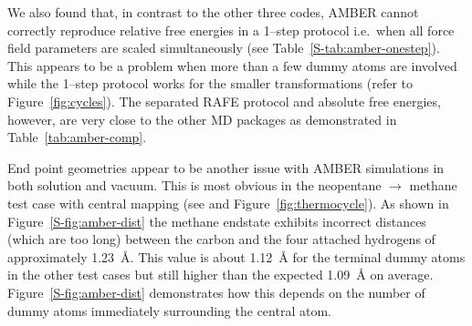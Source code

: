 \documentclass[journal=jctcce,manuscript=article]{achemso}
\begin{document}
We also found that, in contrast to the other three codes, AMBER cannot
correctly reproduce relative free energies in a 1--step protocol i.e.\
when all force field parameters are scaled simultaneously (see Table~\ref{S-tab:amber-onestep}).  This appears to be a problem when more than a few dummy atoms are involved while the 1--step protocol works for the smaller transformations (refer to Figure~\ref{fig:cycles}).  The separated RAFE protocol and absolute free energies, however, are very close to the other MD packages as demonstrated in Table~\ref{tab:amber-comp}.

End point geometries appear to be another issue with AMBER simulations
in both solution and vacuum.  This is most obvious in the neopentane 
$\rightarrow$ methane test case with central mapping (see 
 and Figure~\ref{fig:thermocycle}).
As shown in Figure~\ref{S-fig:amber-dist} the methane endstate exhibits 
incorrect distances (which are too long) between the carbon and the four 
attached hydrogens of approximately \SI{1.23}{\angstrom}.  This value is about 
\SI{1.12}{\angstrom} for the terminal dummy atoms in the other test cases but 
still higher than the expected \SI{1.09}{\angstrom} on average.  
Figure~\ref{S-fig:amber-dist} demonstrates how this depends on the number of 
dummy atoms immediately surrounding the central atom.
\end{document}
